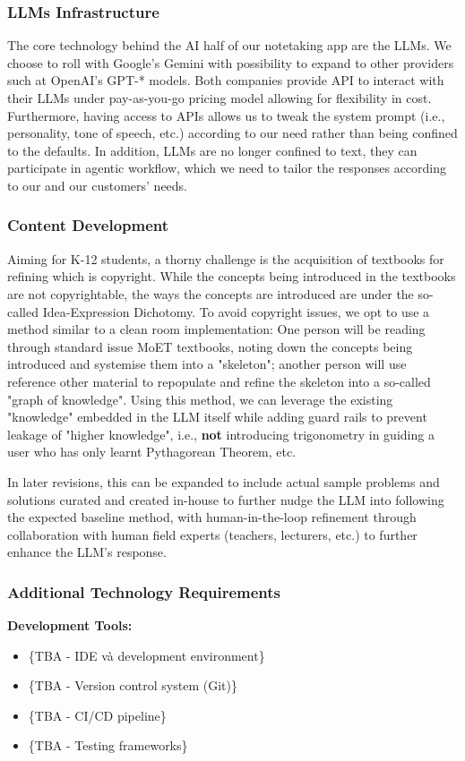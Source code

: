 \subsubsection{LLMs Infrastructure}
The core technology behind the AI half of our notetaking app are the LLMs. We choose to roll with
 Google's Gemini with possibility to expand to other providers such at OpenAI's GPT-* models. Both companies provide
 API to interact with their LLMs under pay-as-you-go pricing model allowing for flexibility in cost. Furthermore,
 having access to APIs allows us to tweak the system prompt (i.e., personality, tone of speech, etc.) according to our
 need rather than being confined to the defaults. In addition, LLMs are no longer confined to text, they can
 participate in agentic workflow, which we need to tailor the responses according to our and our customers' needs.

\subsubsection{Content Development}
Aiming for K-12 students, a thorny challenge is the acquisition of textbooks for refining
 which is copyright. While the concepts being introduced in the textbooks are not copyrightable, the ways the concepts
 are introduced are under the so-called Idea-Expression Dichotomy. To avoid copyright issues, we opt to use a method
 similar to a clean room implementation: One person will be reading through standard issue MoET textbooks, noting down
 the concepts being introduced and systemise them into a "skeleton"; another person will use reference other material
 to repopulate and refine the skeleton into a so-called "graph of knowledge". Using this method, we can leverage the
 existing "knowledge" embedded in the LLM itself while adding guard rails to prevent leakage of "higher knowledge",
 i.e., \textbf{not} introducing trigonometry in guiding a user who has only learnt Pythagorean Theorem, etc. 

 In later revisions, this can be expanded to include actual sample problems and solutions curated and created in-house
 to further nudge the LLM into following the expected baseline method, with human-in-the-loop refinement through
 collaboration with human field experts (teachers, lecturers, etc.) to further enhance the LLM's response.

\subsubsection{Additional Technology Requirements}
\textbf{Development Tools:}
\begin{itemize}
    \item \{TBA - IDE và development environment\}
    \item \{TBA - Version control system (Git)\}
    \item \{TBA - CI/CD pipeline\}
    \item \{TBA - Testing frameworks\}
\end{itemize}


